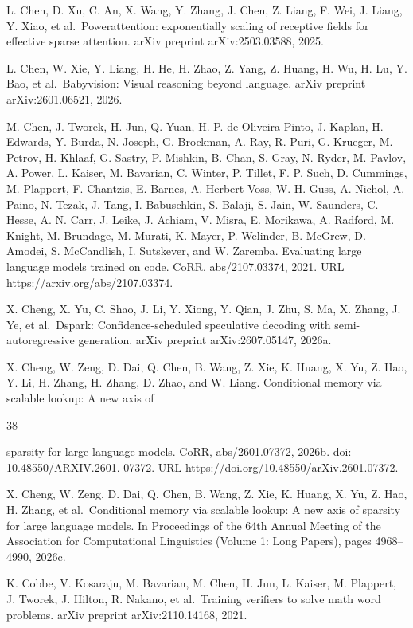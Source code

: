 \documentclass[
  10
]{article}
\begin{document}
L. Chen, D. Xu, C. An, X. Wang, Y. Zhang, J. Chen, Z. Liang, F. Wei, J.
Liang, Y. Xiao, et al.~Powerattention: exponentially scaling of
receptive fields for effective sparse attention. arXiv preprint
arXiv:2503.03588, 2025.

L. Chen, W. Xie, Y. Liang, H. He, H. Zhao, Z. Yang, Z. Huang, H. Wu, H.
Lu, Y. Bao, et al.~Babyvision: Visual reasoning beyond language. arXiv
preprint arXiv:2601.06521, 2026.

M. Chen, J. Tworek, H. Jun, Q. Yuan, H. P. de Oliveira Pinto, J. Kaplan,
H. Edwards, Y. Burda, N. Joseph, G. Brockman, A. Ray, R. Puri, G.
Krueger, M. Petrov, H. Khlaaf, G. Sastry, P. Mishkin, B. Chan, S. Gray,
N. Ryder, M. Pavlov, A. Power, L. Kaiser, M. Bavarian, C. Winter, P.
Tillet, F. P. Such, D. Cummings, M. Plappert, F. Chantzis, E. Barnes, A.
Herbert-Voss, W. H. Guss, A. Nichol, A. Paino, N. Tezak, J. Tang, I.
Babuschkin, S. Balaji, S. Jain, W. Saunders, C. Hesse, A. N. Carr, J.
Leike, J. Achiam, V. Misra, E. Morikawa, A. Radford, M. Knight, M.
Brundage, M. Murati, K. Mayer, P. Welinder, B. McGrew, D. Amodei, S.
McCandlish, I. Sutskever, and W. Zaremba. Evaluating large language
models trained on code. CoRR, abs/2107.03374, 2021. URL
https://arxiv.org/abs/2107.03374.

X. Cheng, X. Yu, C. Shao, J. Li, Y. Xiong, Y. Qian, J. Zhu, S. Ma, X.
Zhang, J. Ye, et al.~Dspark: Confidence-scheduled speculative decoding
with semi-autoregressive generation. arXiv preprint arXiv:2607.05147,
2026a.

X. Cheng, W. Zeng, D. Dai, Q. Chen, B. Wang, Z. Xie, K. Huang, X. Yu, Z.
Hao, Y. Li, H. Zhang, H. Zhang, D. Zhao, and W. Liang. Conditional
memory via scalable lookup: A new axis of

38

sparsity for large language models. CoRR, abs/2601.07372, 2026b. doi:
10.48550/ARXIV.2601. 07372. URL
https://doi.org/10.48550/arXiv.2601.07372.

X. Cheng, W. Zeng, D. Dai, Q. Chen, B. Wang, Z. Xie, K. Huang, X. Yu, Z.
Hao, H. Zhang, et al.~Conditional memory via scalable lookup: A new axis
of sparsity for large language models. In Proceedings of the 64th Annual
Meeting of the Association for Computational Linguistics (Volume 1: Long
Papers), pages 4968--4990, 2026c.

K. Cobbe, V. Kosaraju, M. Bavarian, M. Chen, H. Jun, L. Kaiser, M.
Plappert, J. Tworek, J. Hilton, R. Nakano, et al.~Training verifiers to
solve math word problems. arXiv preprint arXiv:2110.14168, 2021.
\end{document}

